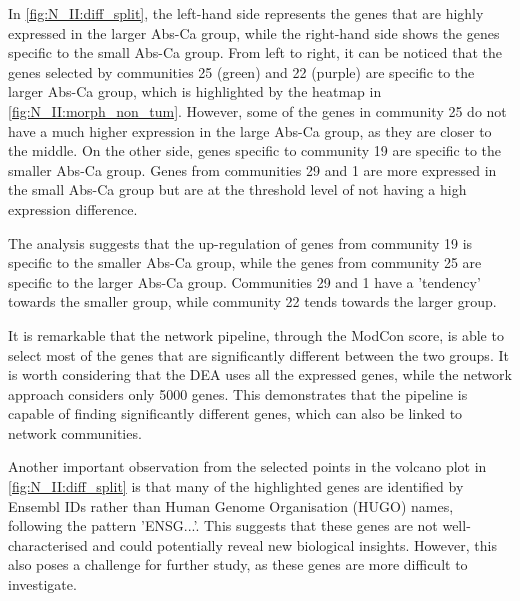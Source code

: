 
In \cref{fig:N_II:diff_split}, the left-hand side represents the genes that are highly expressed in the larger Abs-Ca group, while the right-hand side shows the genes specific to the small Abs-Ca group. From left to right, it can be noticed that the genes selected by communities 25 (green) and 22 (purple) are specific to the larger Abs-Ca group, which is highlighted by the heatmap in \cref{fig:N_II:morph_non_tum}. However, some of the genes in community 25 do not have a much higher expression in the large Abs-Ca group, as they are closer to the middle. On the other side, genes specific to community 19 are specific to the smaller Abs-Ca group. Genes from communities 29 and 1 are more expressed in the small Abs-Ca group but are at the threshold level of not having a high expression difference.

The analysis suggests that the up-regulation of genes from community 19 is specific to the smaller Abs-Ca group, while the genes from community 25 are specific to the larger Abs-Ca group. Communities 29 and 1 have a 'tendency' towards the smaller group, while community 22 tends towards the larger group.

It is remarkable that the network pipeline, through the ModCon score, is able to select most of the genes that are significantly different between the two groups. It is worth considering that the DEA uses all the expressed genes, while the network approach considers only 5000 genes. This demonstrates that the pipeline is capable of finding significantly different genes, which can also be linked to network communities.

Another important observation from the selected points in the volcano plot in \cref{fig:N_II:diff_split} is that many of the highlighted genes are identified by Ensembl IDs rather than Human Genome Organisation (HUGO) names, following the pattern 'ENSG...'. This suggests that these genes are not well-characterised and could potentially reveal new biological insights. However, this also poses a challenge for further study, as these genes are more difficult to investigate.


